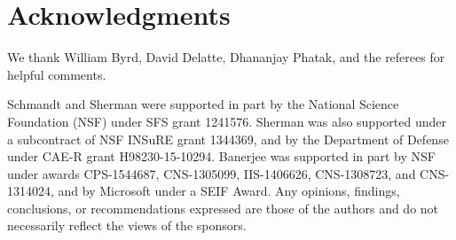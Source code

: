 \section{Acknowledgments}


We thank William Byrd, David Delatte, Dhananjay Phatak, 
and the referees for helpful comments.

Schmandt and Sherman were supported in part by the 
National Science Foundation (NSF) under SFS grant 1241576. 
Sherman was also supported under a subcontract of NSF INSuRE grant 1344369, 
and by the Department of Defense under CAE-R grant H98230-15-10294.
Banerjee was supported in part by NSF under awards 
CPS-1544687, CNS-1305099, IIS-1406626, CNS-1308723, and CNS-1314024, 
and by Microsoft under a SEIF Award.
Any opinions, findings, conclusions, or recommendations expressed 
are those of the authors and do not necessarily reflect the views
of the sponsors.
